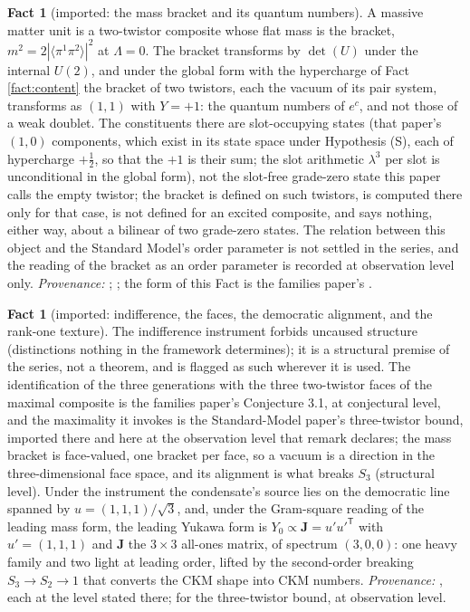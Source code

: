 \documentclass[11pt]{article}
\theoremstyle{definition}
\newtheorem{fact}[theorem]{Fact}
\newcommand{\br}[1]{\langle #1\rangle}
\newcommand{\J}{\mathbf{J}}
\begin{document}
\begin{fact}[imported: the mass bracket and its quantum numbers]\label{fact:bracket}
A massive matter unit is a two-twistor composite whose flat mass is the bracket, $m^{2} = 2|\br{\pi^{1}\pi^{2}}|^{2}$ at $\Lambda = 0$. The bracket transforms by $\det(U)$ under the internal $U(2)$, and under the global form with the hypercharge of Fact \ref{fact:content} the bracket of two twistors, each the vacuum of its pair system, transforms as $(1,1)$ with $Y = +1$: the quantum numbers of $e^{c}$, and not those of a weak doublet. The constituents there are slot-occupying states (that paper's $(1,0)$ components, which exist in its state space under Hypothesis (S), each of hypercharge $+\tfrac12$, so that the $+1$ is their sum; the slot arithmetic $\lambda^{3}$ per slot is unconditional in the global form), not the slot-free grade-zero state this paper calls the empty twistor; the bracket is defined on such twistors, is computed there only for that case, is not defined for an excited composite, and says nothing, either way, about a bilinear of two grade-zero states. The relation between this object and the Standard Model's order parameter is not settled in the series, and the reading of the bracket as an order parameter is recorded at observation level only. \emph{Provenance:} \cite[Props.~3.1-3.2]{ButlerT12}; \cite[Prop.~4.1]{ButlerT11}; the form of this Fact is the families paper's \cite[Fact~2.1]{ButlerT13}.
\end{fact}

\begin{fact}[imported: indifference, the faces, the democratic alignment, and the rank-one texture]\label{fact:democracy}
The indifference instrument forbids uncaused structure (distinctions nothing in the framework determines); it is a structural premise of the series, not a theorem, and is flagged as such wherever it is used. The identification of the three generations with the three two-twistor faces of the maximal composite is the families paper's Conjecture 3.1, at conjectural level, and the maximality it invokes is the Standard-Model paper's three-twistor bound, imported there and here at the observation level that remark declares; the mass bracket is face-valued, one bracket per face, so a vacuum is a direction in the three-dimensional face space, and its alignment is what breaks $S_{3}$ (structural level). Under the instrument the condensate's source lies on the democratic line spanned by $u = (1,1,1)/\sqrt{3}$, and, under the Gram-square reading of the leading mass form, the leading Yukawa form is $Y_{0} \propto \J = u'u'^{\mathsf{T}}$ with $u' = (1,1,1)$ and $\J$ the $3 \times 3$ all-ones matrix, of spectrum $(3, 0, 0)$: one heavy family and two light at leading order, lifted by the second-order breaking $S_{3} \to S_{2} \to 1$ that converts the CKM shape into CKM numbers. \emph{Provenance:} \cite[Fact~2.5, Conj.~3.1, Prop.~4.3, Prop.~4.4(1)]{ButlerT13}, each at the level stated there; \cite[Rem.~3.3]{ButlerT12} for the three-twistor bound, at observation level.
\end{fact}
\end{document}
